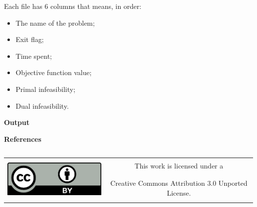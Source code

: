 \documentclass[]{beamer}
\begin{document}
\begin{frame}[t,fragile]
\begin{columns}[t]
\begin{column}{0.4\textwidth}
      Each file has 6 columns that means, in order:
      \begin{itemize}
        \item The name of the problem;
        \item Exit flag;
        \item Time spent;
        \item Objective function value;
        \item Primal infeasibility;
        \item Dual infeasibility.
      \end{itemize}

      \textbf{Output}

      \textbf{References}

      \printbibliography
    \end{column}
  \end{columns}
  \vfill
  \begin{center}
    \begin{tabular}[]{cc}
      \multirow{2}{*}{\includegraphics[height=60pt]{figures/cc-by}} &
      \Large{This work is licensed under a}\\ &
      \Large{Creative Commons Attribution 3.0 Unported License.}
    \end{tabular}
  \end{center}
\end{frame}
\end{document}
